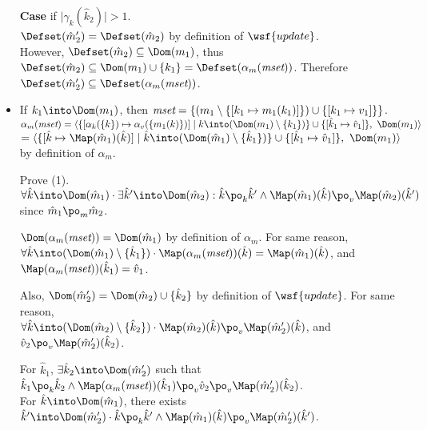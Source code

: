 \begin{itemize}
\textbf{Case} if $\mid \gamma_k(\hat{k}_2) \mid > 1$.\\
$\Defset(\hat{m}_2') = \Defset(\hat{m}_2)$ by definition of $\wsf{update}$.\\
However, $\Defset(\hat{m}_2) \subseteq \Dom(m_1)$,
thus $\Defset(\hat{m}_2) \subseteq \Dom(m_1) \cup \{ k_1 \}
= \Defset(\alpha_m(\emph{mset}))$.
Therefore $\Defset(\hat{m}_2') \subseteq \Defset(\alpha_m(\emph{mset}))$.

\item If $k_1 \into \Dom(m_1)$,
then $\emph{mset} = \{ (m_1 \setminus \{ [ k_1 \mapsto m_1(k_1)] \}) \cup \{ [k_1 \mapsto v_1]\} \}$.\\
$\alpha_m(\emph{mset}) = 
\langle \{ [\alpha_k(\{ k \}) \mapsto \alpha_v(\{ m_1(k) \} )] \mid 
k \into (\Dom(m_1) \setminus \{ k_1 \})\}
\cup \{ [ \hat{k}_1 \mapsto \hat{v}_1 ] \},\ \Dom(m_1) \rangle$\\
$= \langle \{ [ \hat{k} \mapsto \Map(\hat{m}_1)(\hat{k}) ] \mid 
\hat{k} \into (\Dom(\hat{m}_1) \setminus \{ \hat{k}_1 \}) \}
\cup \{ [ \hat{k}_1 \mapsto \hat{v}_1 ] \},\ \Dom(m_1) \rangle$
by definition of $\alpha_m$.

Prove (1). \\
$\forall \hat{k} \into \Dom(\hat{m}_1) \cdot \exists \hat{k}' \into \Dom(\hat{m}_2):
\hat{k} \po_k \hat{k}' \land \Map(\hat{m}_1)(\hat{k}) \po_v \Map(\hat{m}_2)(\hat{k}')$
since $\hat{m}_1 \po_m \hat{m}_2$.

$\Dom(\alpha_m(\emph{mset})) = \Dom(\hat{m}_1)$ 
by definition of $\alpha_m$. For same reason, \\
$\forall \hat{k} \into (\Dom(\hat{m}_1) \setminus \{ \hat{k}_1 \}) \cdot
\Map(\alpha_m(\emph{mset}))(\hat{k}) = \Map(\hat{m}_1)(\hat{k})$,
and $\Map(\alpha_m(\emph{mset}))(\hat{k}_1) = \hat{v}_1$.

Also, $\Dom(\hat{m}_2') = \Dom(\hat{m}_2) \cup \{ \hat{k}_2 \}$
by definition of $\wsf{update}$. For same reason, \\
$\forall \hat{k} \into (\Dom(\hat{m}_2) \setminus \{ \hat{k}_2 \}) \cdot
\Map(\hat{m}_2)(\hat{k}) \po_v \Map(\hat{m}_2')(\hat{k})$,
and $\hat{v}_2 \po_v \Map(\hat{m}_2')(\hat{k}_2)$.

For $\hat{k}_1$, $\exists \hat{k}_2 \into \Dom(\hat{m}_2')$
such that $\hat{k}_1 \po_k \hat{k}_2 \land 
\Map(\alpha_m(\emph{mset}))(\hat{k}_1) \po_v \hat{v}_2 \po_v \Map(\hat{m}_2')(\hat{k}_2)$.\\
For $\hat{k} \into \Dom(\hat{m}_1)$,
there exists $\hat{k}' \into \Dom(\hat{m}_2') \cdot
\hat{k} \po_k \hat{k}' \land \Map(\hat{m}_1)(\hat{k}) \po_v \Map(\hat{m}_2')(\hat{k}')$.


\end{itemize}
